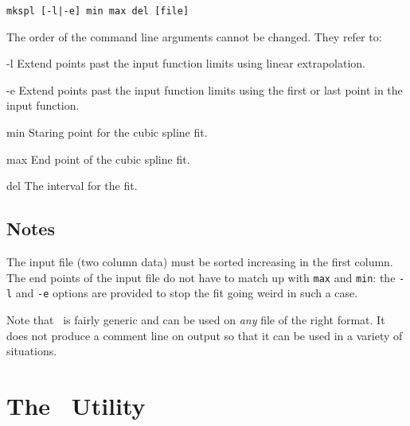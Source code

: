 \documentclass[11pt,twoside]{article}
\begin{document}
\begin{verbatim}
mkspl [-l|-e] min max del [file]
\end{verbatim}

\nin
The order of the command line arguments cannot be changed. They refer to:
\medskip

\begin{clo}{-l}
Extend points past the input function limits using linear extrapolation.
\end{clo}

\begin{clo}{-e}
Extend points past the input function limits using the first or last point
in the input function.
\end{clo}

\begin{clo}{min}
Staring point for the cubic spline fit.
\end{clo}

\begin{clo}{max}
End point of the cubic spline fit.
\end{clo}

\begin{clo}{del}
The interval for the fit.
\end{clo}

\subsection*{Notes}

The input file (two column data) must be sorted increasing in the first
column. The end points of the input file do not have to match up with 
{\tt max} and {\tt min}: the {\tt -l} and {\tt -e} options are provided to 
stop the fit going weird in such a case.

Note that \mkspl\ is fairly generic and can be used on {\em any} file of the
right format. It does not produce a comment line on output so that it can be
used in a variety of situations.



\newpage
\section{The \mkxlf\ Utility}
\end{document}
